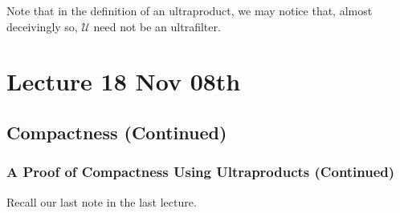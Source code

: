 \documentclass[notoc,notitlepage]{tufte-book}
\begin{document}
\begin{note}
  Note that in the definition of an ultraproduct, we may notice that, almost deceivingly so, $\mathcal{U}$ need not be an ultrafilter.
\end{note}




\chapter{Lecture 18 Nov 08th}%
\label{chp:lecture_18_nov_08th}

\section{Compactness (Continued)}%
\label{sec:compactness_continued}

\subsection{A Proof of Compactness Using Ultraproducts (Continued)}%
\label{sub:a_proof_of_compactness_using_ultraproducts_continued}

Recall our last note in the last lecture.
\end{document}
